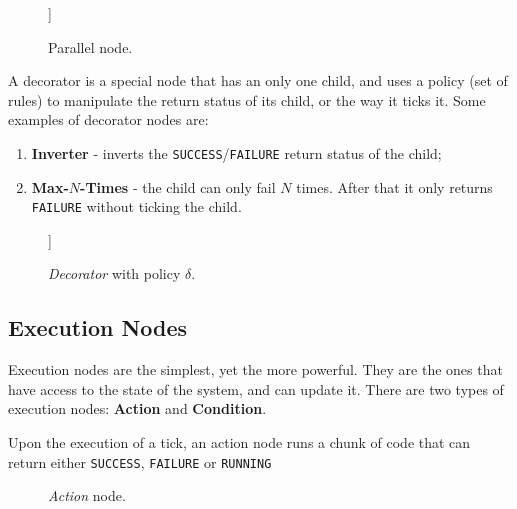 \documentclass[a4paper,UKenglish,cleveref, autoref, thm-restate]{oasics-v2019}
\begin{document}
\begin{figure}[H]
    \centering
    \begin{behavior}
        [\parallel{M}
            [\action{Child 1}]
            [\action{Child 2}]
            [{\textbf{. . .}}, inner sep=10pt]
            [\action{Child N}]
        ]
    \end{behavior}
    \caption{Parallel node.}
    \label{fig:parallel}
\end{figure}


A decorator is a special node that has an only one child, and uses a policy (set of rules) to manipulate the return status of its child, or the way it ticks it.
Some examples of decorator nodes are:
\begin{enumerate}
    \item \textbf{Inverter} - inverts the \texttt{SUCCESS}/\texttt{FAILURE} return status of the child;
    \item \textbf{Max-$N$-Times} - the child can only fail $N$ times.
    After that it only returns \texttt{FAILURE} without ticking the child.
\end{enumerate}

\begin{figure}[H]
    \centering
    \begin{behavior}
        [\decorator{$\delta$},
            [\action{Child}]
        ]
    \end{behavior}
    \caption{\textit{Decorator} with policy $\delta$.}
    \label{fig:decorator}
\end{figure}


\subsection{Execution Nodes}
Execution nodes are the simplest, yet the more powerful. They are the ones that have access to the state of the system, and can update it.
There are two types of execution nodes: \textbf{Action} and \textbf{Condition}.


Upon the execution of a tick, an action node runs a chunk of code that can return either \texttt{SUCCESS}, \texttt{FAILURE} or \texttt{RUNNING}

\begin{figure}[H]
    \centering
    \begin{behavior}
    \end{behavior}
    \caption{\textit{Action} node.}
    \label{fig:action}
\end{figure}
\end{document}
